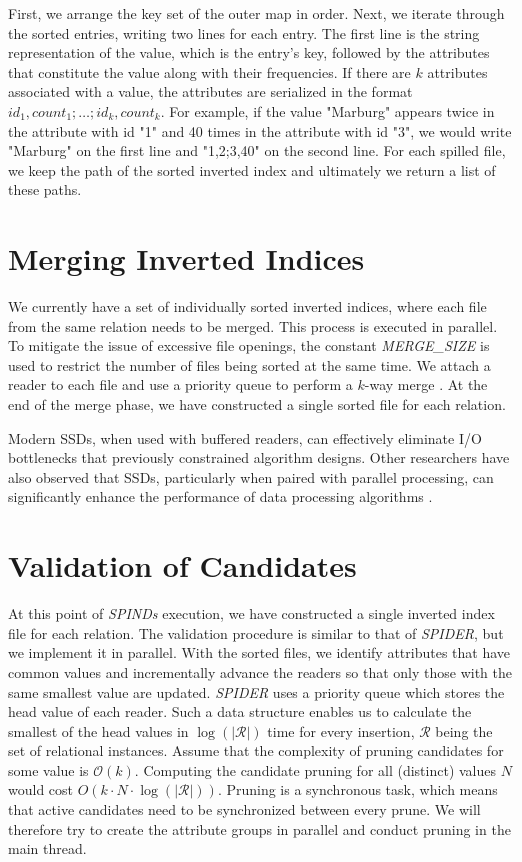 First, we arrange the key set of the outer map in order. Next, we iterate through the sorted entries, writing two lines for each entry. The first line is the string representation of the value, which is the entry's key, followed by the attributes that constitute the value along with their frequencies. If there are $k$ attributes associated with a value, the attributes are serialized in the format $id_1,count_1;\dots;id_k,count_k$. For example, if the value "Marburg" appears twice in the attribute with id "1" and 40 times in the attribute with id "3", we would write "Marburg" on the first line and "1,2;3,40" on the second line. For each spilled file, we keep the path of the sorted inverted index and ultimately we return a list of these paths.

\section{Merging Inverted Indices}\label{subsec:spind_merge}
We currently have a set of individually sorted inverted indices, where each file from the same relation needs to be merged. This process is executed in parallel. To mitigate the issue of excessive file openings, the constant \textit{MERGE\_SIZE} is used to restrict the number of files being sorted at the same time. We attach a reader to each file and use a priority queue to perform a $k$-way merge \cite{taniar2008high}. At the end of the merge phase, we have constructed a single sorted file for each relation.

Modern SSDs, when used with buffered readers, can effectively eliminate I/O bottlenecks that previously constrained algorithm designs. Other researchers have also observed that SSDs, particularly when paired with parallel processing, can significantly enhance the performance of data processing algorithms \cite{meena2014performance}.

\section{Validation of Candidates}\label{sec:spind_val}
At this point of \textit{SPINDs} execution, we have constructed a single inverted index file for each relation. The validation procedure is similar to that of \textit{SPIDER}, but we implement it in parallel. With the sorted files, we identify attributes that have common values and incrementally advance the readers so that only those with the same smallest value are updated. \textit{SPIDER} uses a priority queue which stores the head value of each reader. Such a data structure enables us to calculate the smallest of the head values in $\log(|\mathcal{R}|)$ time for every insertion, $\mathcal{R}$ being the set of relational instances. Assume that the complexity of pruning candidates for some value is $\mathcal{O}(k)$. Computing the candidate pruning for all (distinct) values $N$ would cost $O(k \cdot N \cdot \log(|\mathcal{R}|))$. Pruning is a synchronous task, which means that active candidates need to be synchronized between every prune. We will therefore try to create the attribute groups in parallel and conduct pruning in the main thread.

